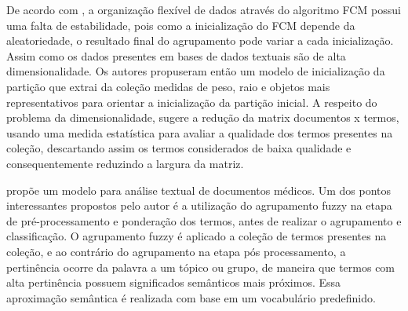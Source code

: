 De acordo com \cite{Deng2010}, a organização flexível de dados através do algoritmo FCM possui
uma falta de estabilidade, pois como a inicialização do FCM depende da aleatoriedade, o resultado
final do agrupamento pode variar a cada inicialização. Assim como os dados presentes em bases de
dados textuais são de alta dimensionalidade.  Os autores propuseram então um modelo de inicialização
da partição que extrai da coleção medidas de peso, raio e objetos mais representativos para orientar
a inicialização da partição inicial. A respeito do problema da dimensionalidade, \cite{Deng2010}
sugere a redução da matrix documentos x termos, usando uma medida estatística para avaliar a
qualidade dos termos presentes na coleção, descartando assim os termos considerados de baixa
qualidade e consequentemente reduzindo a largura da matriz.

\cite{Karami2015} propõe um modelo para análise textual de documentos médicos. Um dos pontos
interessantes propostos pelo autor é a utilização do agrupamento fuzzy na etapa de
pré-processamento e ponderação dos termos, antes de realizar o agrupamento e classificação. 
O agrupamento fuzzy é aplicado a coleção de termos presentes na coleção, e ao contrário do
agrupamento na etapa pós processamento, a pertinência ocorre da palavra a um tópico ou grupo, 
de maneira que termos com alta pertinência possuem significados
semânticos mais próximos. Essa aproximação semântica é realizada com base em um vocabulário
predefinido.

